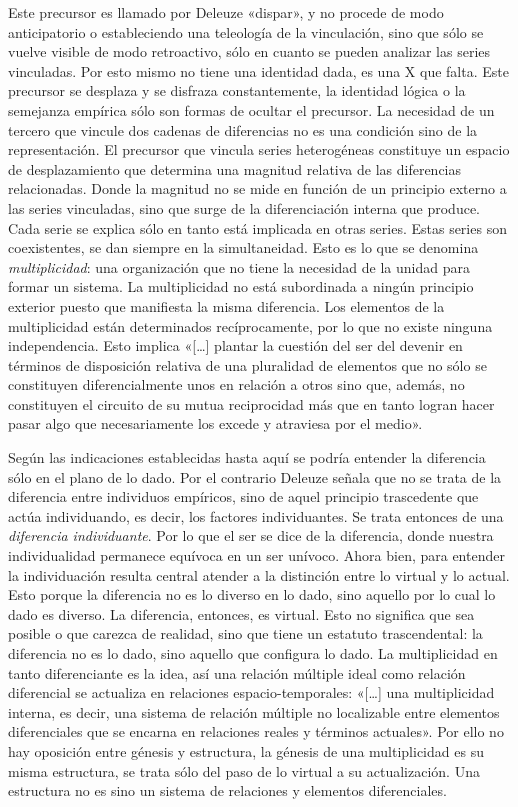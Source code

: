 Este precursor es llamado por Deleuze «dispar», y no procede de modo anticipatorio o estableciendo una teleología de la vinculación, sino que sólo se vuelve visible de modo retroactivo, sólo en cuanto se pueden analizar las series vinculadas. Por esto mismo no tiene una identidad dada, es una X que falta. Este precursor se desplaza y se disfraza constantemente, la identidad lógica o la semejanza empírica sólo son formas de ocultar el precursor. La necesidad de un tercero que vincule dos cadenas de diferencias no es una condición sino de la representación. El precursor que vincula series heterogéneas constituye un espacio de desplazamiento que determina una magnitud relativa de las diferencias relacionadas. Donde la magnitud no se mide en función de un principio externo a las series vinculadas, sino que surge de la diferenciación interna que produce. Cada serie se explica sólo en tanto está implicada en otras series. Estas series son coexistentes, se dan siempre en la simultaneidad. Esto es lo que se denomina \emph{multiplicidad}: una organización que no tiene la necesidad de la unidad para formar un sistema. La multiplicidad no está subordinada a ningún principio exterior puesto que manifiesta la misma diferencia. Los elementos de la multiplicidad están determinados recíprocamente, por lo que no existe ninguna independencia. Esto implica «{[}\ldots{]} plantar la cuestión del ser del devenir en términos de disposición relativa de una pluralidad de elementos que no sólo se constituyen diferencialmente unos en relación a otros sino que, además, no constituyen el circuito de su mutua reciprocidad más que en tanto logran hacer pasar algo que necesariamente los excede y atraviesa por el medio».

Según las indicaciones establecidas hasta aquí se podría entender la diferencia sólo en el plano de lo dado. Por el contrario Deleuze señala que no se trata de la diferencia entre individuos empíricos, sino de aquel principio trascedente que actúa individuando, es decir, los factores individuantes. Se trata entonces de una \emph{diferencia individuante}. Por lo que el ser se dice de la diferencia, donde nuestra individualidad permanece equívoca en un ser unívoco. Ahora bien, para entender la individuación resulta central atender a la distinción entre lo virtual y lo actual. Esto porque la diferencia no es lo diverso en lo dado, sino aquello por lo cual lo dado es diverso. La diferencia, entonces, es virtual. Esto no significa que sea posible o que carezca de realidad, sino que tiene un estatuto trascendental: la diferencia no es lo dado, sino aquello que configura lo dado. La multiplicidad en tanto diferenciante es la idea, así una relación múltiple ideal como relación diferencial se actualiza en relaciones espacio-temporales: «{[}\ldots{]} una multiplicidad interna, es decir, una sistema de relación múltiple no localizable entre elementos diferenciales que se encarna en relaciones reales y términos actuales». Por ello no hay oposición entre génesis y estructura, la génesis de una multiplicidad es su misma estructura, se trata sólo del paso de lo virtual a su actualización. Una estructura no es sino un sistema de relaciones y elementos diferenciales.

